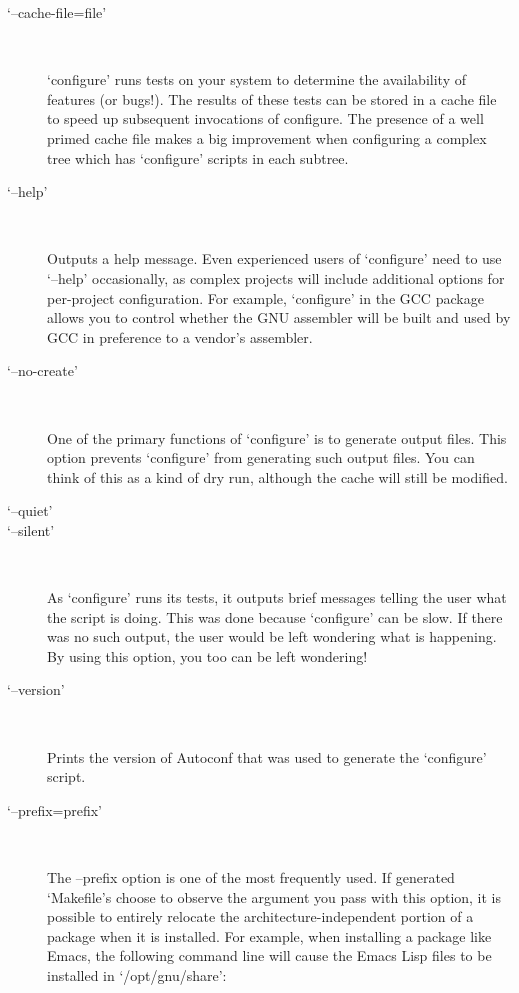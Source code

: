 \begin{description}
\item[`--cache-file=file']
\ %

`configure' runs tests on your system to determine the availability of features (or bugs!). The results of these tests can be stored in a cache file to speed up subsequent invocations of configure. The presence of a well primed cache file makes a big improvement when configuring a complex tree which has `configure' scripts in each subtree. 

\item[`--help']
\ %

Outputs a help message. Even experienced users of `configure' need to use `--help' occasionally, as complex projects will include additional options for per-project configuration. For example, `configure' in the GCC package allows you to control whether the GNU assembler will be built and used by GCC in preference to a vendor's assembler. 

\item[`--no-create']
\ %

One of the primary functions of `configure' is to generate output files. This option prevents `configure' from generating such output files. You can think of this as a kind of dry run, although the cache will still be modified. 

\item[`--quiet']
\item[`--silent']
\ %

As `configure' runs its tests, it outputs brief messages telling the user what the script is doing. This was done because `configure' can be slow. If there was no such output, the user would be left wondering what is happening. By using this option, you too can be left wondering! 

\item[`--version']
\ %

Prints the version of Autoconf that was used to generate the `configure' script. 

\item[`--prefix=prefix']
\ %

The --prefix option is one of the most frequently used. If generated `Makefile's choose to observe the argument you pass with this option, it is possible to entirely relocate the architecture-independent portion of a package when it is installed. For example, when installing a package like Emacs, the following command line will cause the Emacs Lisp files to be installed in `/opt/gnu/share': 



\end{description}
